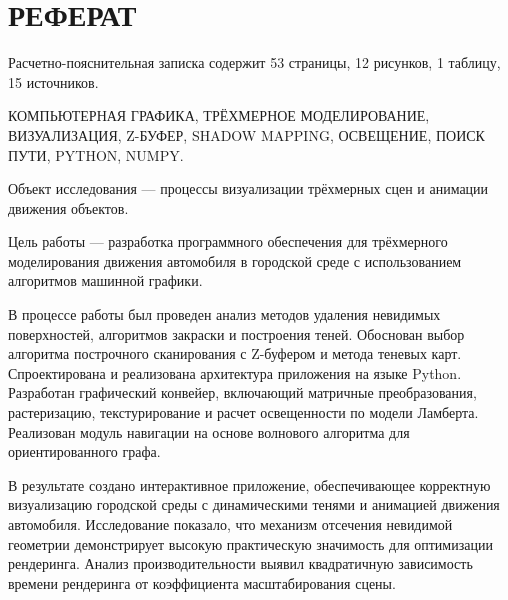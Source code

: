 \chapter*{РЕФЕРАТ}

Расчетно-пояснительная записка содержит 53 страницы, 12 рисунков, 1 таблицу, 15 источников.

КОМПЬЮТЕРНАЯ ГРАФИКА, ТРЁХМЕРНОЕ МОДЕЛИРОВАНИЕ, ВИЗУАЛИЗАЦИЯ, Z-БУФЕР, SHADOW MAPPING, ОСВЕЩЕНИЕ, ПОИСК ПУТИ, PYTHON, NUMPY.

Объект исследования --- процессы визуализации трёхмерных сцен и анимации движения объектов.

Цель работы --- разработка программного обеспечения для трёхмерного моделирования движения автомобиля в городской среде с использованием алгоритмов машинной графики.

В процессе работы был проведен анализ методов удаления невидимых поверхностей, алгоритмов закраски и построения теней. Обоснован выбор алгоритма построчного сканирования с Z-буфером и метода теневых карт. Спроектирована и реализована архитектура приложения на языке Python. Разработан графический конвейер, включающий матричные преобразования, растеризацию, текстурирование и расчет освещенности по модели Ламберта. Реализован модуль навигации на основе волнового алгоритма для ориентированного графа.

В результате создано интерактивное приложение, обеспечивающее корректную визуализацию городской среды с динамическими тенями и анимацией движения автомобиля. Исследование показало, что механизм отсечения невидимой геометрии демонстрирует высокую практическую значимость для оптимизации рендеринга. Анализ производительности выявил квадратичную зависимость времени рендеринга от коэффициента масштабирования сцены.